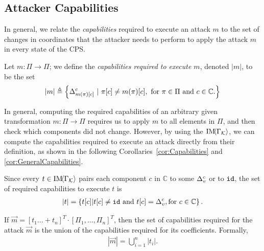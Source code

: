 {{\subsection{Attacker Capabilities}
\label{sec:AttackerCapabilities}
In general, we relate the \emph{capabilities} required to execute an attack $m$ to the set of changes in coordinates that the attacker needs to perform to apply the attack $m$ in every state of the CPS.  %
\begin{definition}
Let ${m}\colon \Pi\rightarrow \Pi$; we define the \emph{capabilities required to execute $m$}, denoted $|m|$, to be the set  
\begin{align}
  |m|\triangleq \left\{{\Delta}^c_{m(\pi)[c]}\ |\ \pi[c]\neq m(\pi)[c],\text{ for $\pi\in\Pi$ and $c\in \mathbb{C}$.}\right\}
\end{align}
\end{definition}
In general, computing the required capabilities of an arbitrary given transformation $m\colon \Pi\rightarrow\Pi$ requires us to apply $m$ to all elements in $\Pi$, and then check which components did not change. However, by using the $\text{IM}\!{{\left<\Gamma_{\mathcal{K}}\right>}}$, we can compute the {capabilities} required to execute an attack directly from their definition, as shown in the following Corollaries~\ref{cor:Capabilities} and \ref{cor:GeneralCapabilities}. 

\begin{corollary}
\label{cor:Capabilities}
Since every $t\in \text{IM}\!{{\left<\Gamma_{\mathcal{K}}\right>}}$ pairs each component $c$ in $\mathbb{C}$ to some ${\Delta}^{c}_{v}$ or to ${\texttt{id}}$, 
the set of required capabilities to execute $t$ is 
\begin{align}
  |t|=\left\{t[c]| t[c]\neq {\texttt{id}} \text{ and } t[c]={\Delta}^{c}_{v}, \text{for $c\in \mathbb{C}$}\right\}.
\end{align}
\end{corollary}
\begin{corollary}
  \label{cor:GeneralCapabilities}
If $\vec{m}=[t_1\ldots + t_n]^T\cdot[\Pi_1, \ldots, \Pi_n]^T$, then the set of capabilities required for the attack $\vec{m}$ is the union of the capabilities required for its coefficients. Formally, 
\begin{align}
  |\vec{m}|=\bigcup_{i=1}^n|t_i|.
\end{align}
\end{corollary}

}}
